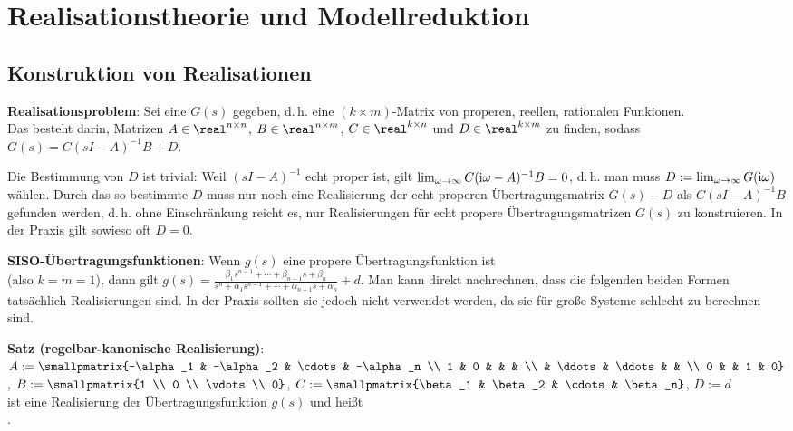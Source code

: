 \section{%
    Realisationstheorie und Modellreduktion%
}

\subsection{%
    Konstruktion von Realisationen%
}

\textbf{Realisationsproblem}:
Sei eine  $G(s)$ gegeben, d.\,h.
eine $(k \times m)$-Matrix von properen, reellen, rationalen Funkionen.\\
Das  besteht darin, Matrizen
$A \in \real^{n \times n}$, $B \in \real^{n \times m}$, $C \in \real^{k \times n}$ und
$D \in \real^{k \times m}$ zu finden, sodass $G(s) = C(sI - A)^{-1} B + D$.

Die Bestimmung von $D$ ist trivial:
Weil $(sI - A)^{-1}$ echt proper ist, gilt
$\lim_{\omega \to \infty} C(\text{i}\omega - A)^{-1} B = 0$, d.\,h. man muss
$D := \lim_{\omega \to \infty} G(\text{i}\omega)$ wählen.
Durch das so bestimmte $D$ muss nur noch eine Realisierung der echt properen Übertragungsmatrix
$G(s) - D$ als $C(sI - A)^{-1} B$ gefunden werden, d.\,h. ohne Einschränkung reicht es,
nur Realisierungen für echt propere Übertragungsmatrizen $G(s)$ zu konstruieren.
In der Praxis gilt sowieso oft $D = 0$.

\linie

\textbf{SISO-Übertragungsfunktionen}:
Wenn $g(s)$ eine propere Übertragungsfunktion ist\\
(also $k = m = 1$), dann gilt
$g(s) = \frac{\beta_1 s^{n-1} + \dotsb + \beta_{n-1} s + \beta_n}
{s^n + \alpha_1 s^{n-1} + \dotsb + \alpha_{n-1} s + \alpha_n} + d$.
Man kann direkt nachrechnen, dass die folgenden beiden Formen tatsächlich Realisierungen sind.
In der Praxis sollten sie jedoch nicht verwendet werden, da sie für große Systeme schlecht zu
berechnen sind.

\textbf{Satz (regelbar-kanonische Realisierung)}:\\
$A := \smallpmatrix{-\alpha_1 & -\alpha_2 & \cdots & -\alpha_n \\
1 & 0 & & & \\ & \ddots & \ddots & & \\ 0 & & 1 & 0}$,
$B := \smallpmatrix{1 \\ 0 \\ \vdots \\ 0}$,
$C := \smallpmatrix{\beta_1 & \beta_2 & \cdots & \beta_n}$,
$D := d$\\
ist eine Realisierung der Übertragungsfunktion $g(s)$ und heißt\\
.

